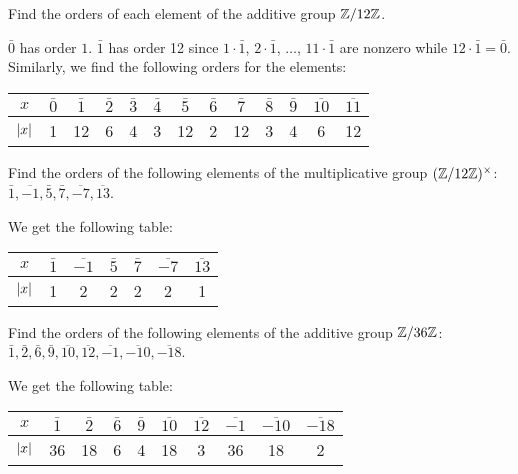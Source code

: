  Find the orders of each element of the additive group
$\mathbb{Z}/12\mathbb{Z}$.
\begin{solution}
  $\bar0$ has order $1$. $\bar1$ has order 12 since $1\cdot\bar1$,
  $2\cdot\bar1$, $\ldots$, $11\cdot\bar1$ are nonzero while
  $12\cdot\bar1 = \bar0$. Similarly, we find the following orders for
  the elements:

  \begin{center}
    \begin{tabular}{c|c|c|c|c|c|c|c|c|c|c|c|c}
      $x$ & $\bar0$ & $\bar1$ & $\bar2$ & $\bar3$ & $\bar4$ & $\bar5$ & $\bar6$
      & $\bar7$ & $\bar8$ & $\bar9$ & $\overline{10}$ & $\overline{11}$ \\\hline
      $\lvert{x}\rvert$ & 1 & 12 & 6 & 4 & 3 & 12 & 2 & 12 & 3 & 4 & 6 & 12
    \end{tabular}
  \end{center}
\end{solution}

 Find the orders of the following elements of the
multiplicative group $(\mathbb{Z}/12\mathbb{Z})^\times$:
$\bar1, \overline{-1}, \bar5, \bar7, \overline{-7}, \overline{13}$.
\begin{solution}
  We get the following table:
  \begin{center}
    \begin{tabular}{c|c|c|c|c|c|c}
      $x$ & $\bar1$ & $\overline{-1}$ & $\bar5$ & $\bar7$ & $\overline{-7}$
      & $\overline{13}$ \\\hline
      $\lvert{x}\rvert$ & 1 & 2 & 2 & 2 & 2 & 1
    \end{tabular}
  \end{center}
\end{solution}

 Find the orders of the following elements of the
additive group $\mathbb{Z}/36\mathbb{Z}$:
$\bar1, \bar2, \bar6, \bar9, \overline{10}, \overline{12},
\overline{-1}, \overline{-10}, \overline{-18}$.
\begin{solution}
  We get the following table:

  \begin{center}
    \begin{tabular}{c|c|c|c|c|c|c|c|c|c}
      $x$ & $\bar1$ & $\bar2$ & $\bar6$ & $\bar9$ & $\overline{10}$
      & $\overline{12}$ & $\overline{-1}$ & $\overline{-10}$
      & $\overline{-18}$ \\\hline
      $\lvert{x}\rvert$ & 36 & 18 & 6 & 4 & 18 & 3 & 36 & 18 & 2
    \end{tabular}
  \end{center}
\end{solution}

